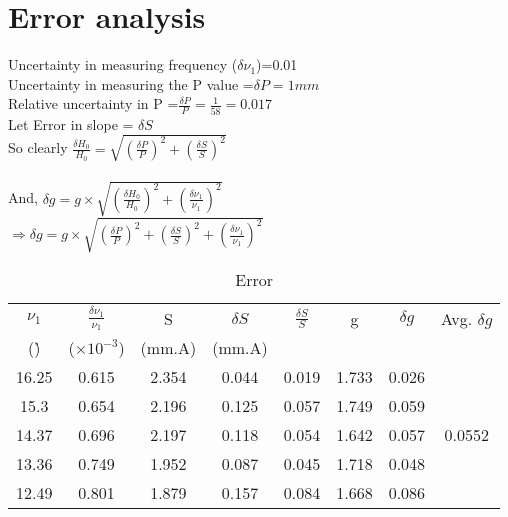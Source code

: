 \section{Error analysis}
Uncertainty in measuring frequency ($\delta \nu_1$)=0.01 \h \\
Uncertainty in measuring the P value =$\delta P=1mm$\\
Relative uncertainty in P =$\frac{\delta P}{P}=\frac{1}{58}=0.017$\\
Let Error in slope = $\delta S$\\
So clearly $\frac{\delta H_0}{H_0}=\sqrt{\left(\frac{\delta P}{P} \right) ^2+
								\left(\frac{\delta S}{S} \right) ^2}$\\ \\
And,
$\delta g = g\times \sqrt{\left(\frac{\delta H_0}{H_0} \right) ^2+
	\left(\frac{\delta \nu_1}{\nu_1} \right) ^2}$\\ 
$\Rightarrow \delta g=g\times \sqrt{\left(\frac{\delta P}{P} \right) ^2+
	\left(\frac{\delta S}{S} \right) ^2+
	\left(\frac{\delta \nu_1}{\nu_1} \right) ^2} $

\begin{table}[H]
	\caption{Error}
	\label{taberr}
	\begin{tabular}{|c|c|c|c|c|c|c|c|}
		\hline
		$\nu_1$ & $\frac{\delta \nu_1}{\nu_1}$       & S      & $\delta S$     & $\frac{\delta S}{S}$  & g     & $\delta g$    & Avg. $\delta g$                    \\ 
		(\h)   & ($\times10^{-3}$) & (mm.A) & (mm.A) &       &       &       &                         \\ \hline
			16.25  & 0.615             & 2.354  & 0.044  & 0.019 & 1.733 & 0.026 & \multirow{5}{*}{0.0552} \\ \cline{1-7}
			15.3   & 0.654             & 2.196  & 0.125  & 0.057 & 1.749 & 0.059 &                         \\ \cline{1-7}
			14.37  & 0.696             & 2.197  & 0.118  & 0.054 & 1.642 & 0.057 &                         \\ \cline{1-7}
			13.36  & 0.749             & 1.952  & 0.087  & 0.045 & 1.718 & 0.048 &                         \\ \cline{1-7}
			12.49  & 0.801             & 1.879  & 0.157  & 0.084 & 1.668 & 0.086 &                         \\ \hline
		\end{tabular}
	\end{table}
